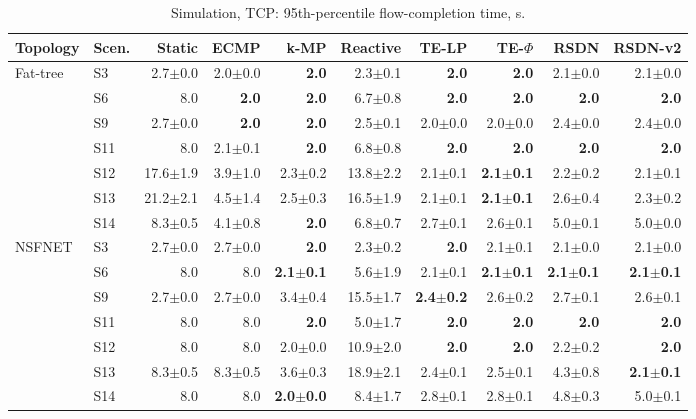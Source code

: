 \begin{table}[t]\centering\scriptsize
\caption{Simulation, TCP: 95th-percentile flow-completion time, s.}\label{tab:sim_fct95}
\setlength{\tabcolsep}{3pt}
\begin{tabular}{llrrrrrrrr}
\toprule
Topology & Scen. & Static & ECMP & k-MP & Reactive & TE-LP & TE-$\Phi$ & RSDN & RSDN-v2\\
\midrule
Fat-tree & S3 & 2.7$\pm$0.0 & 2.0$\pm$0.0 & \textbf{2.0} & 2.3$\pm$0.1 & \textbf{2.0} & \textbf{2.0} & 2.1$\pm$0.0 & 2.1$\pm$0.0\\
 & S6 & 8.0 & \textbf{2.0} & \textbf{2.0} & 6.7$\pm$0.8 & \textbf{2.0} & \textbf{2.0} & \textbf{2.0} & \textbf{2.0}\\
 & S9 & 2.7$\pm$0.0 & \textbf{2.0} & \textbf{2.0} & 2.5$\pm$0.1 & 2.0$\pm$0.0 & 2.0$\pm$0.0 & 2.4$\pm$0.0 & 2.4$\pm$0.0\\
 & S11 & 8.0 & 2.1$\pm$0.1 & \textbf{2.0} & 6.8$\pm$0.8 & \textbf{2.0} & \textbf{2.0} & \textbf{2.0} & \textbf{2.0}\\
 & S12 & 17.6$\pm$1.9 & 3.9$\pm$1.0 & 2.3$\pm$0.2 & 13.8$\pm$2.2 & 2.1$\pm$0.1 & \textbf{2.1$\pm$0.1} & 2.2$\pm$0.2 & 2.1$\pm$0.1\\
 & S13 & 21.2$\pm$2.1 & 4.5$\pm$1.4 & 2.5$\pm$0.3 & 16.5$\pm$1.9 & 2.1$\pm$0.1 & \textbf{2.1$\pm$0.1} & 2.6$\pm$0.4 & 2.3$\pm$0.2\\
 & S14 & 8.3$\pm$0.5 & 4.1$\pm$0.8 & \textbf{2.0} & 6.8$\pm$0.7 & 2.7$\pm$0.1 & 2.6$\pm$0.1 & 5.0$\pm$0.1 & 5.0$\pm$0.0\\
\midrule
NSFNET & S3 & 2.7$\pm$0.0 & 2.7$\pm$0.0 & \textbf{2.0} & 2.3$\pm$0.2 & \textbf{2.0} & 2.1$\pm$0.1 & 2.1$\pm$0.0 & 2.1$\pm$0.0\\
 & S6 & 8.0 & 8.0 & \textbf{2.1$\pm$0.1} & 5.6$\pm$1.9 & 2.1$\pm$0.1 & \textbf{2.1$\pm$0.1} & \textbf{2.1$\pm$0.1} & \textbf{2.1$\pm$0.1}\\
 & S9 & 2.7$\pm$0.0 & 2.7$\pm$0.0 & 3.4$\pm$0.4 & 15.5$\pm$1.7 & \textbf{2.4$\pm$0.2} & 2.6$\pm$0.2 & 2.7$\pm$0.1 & 2.6$\pm$0.1\\
 & S11 & 8.0 & 8.0 & \textbf{2.0} & 5.0$\pm$1.7 & \textbf{2.0} & \textbf{2.0} & \textbf{2.0} & \textbf{2.0}\\
 & S12 & 8.0 & 8.0 & 2.0$\pm$0.0 & 10.9$\pm$2.0 & \textbf{2.0} & \textbf{2.0} & 2.2$\pm$0.2 & \textbf{2.0}\\
 & S13 & 8.3$\pm$0.5 & 8.3$\pm$0.5 & 3.6$\pm$0.3 & 18.9$\pm$2.1 & 2.4$\pm$0.1 & 2.5$\pm$0.1 & 4.3$\pm$0.8 & \textbf{2.1$\pm$0.1}\\
 & S14 & 8.0 & 8.0 & \textbf{2.0$\pm$0.0} & 8.4$\pm$1.7 & 2.8$\pm$0.1 & 2.8$\pm$0.1 & 4.8$\pm$0.3 & 5.0$\pm$0.1\\

\end{tabular}
\end{table}
